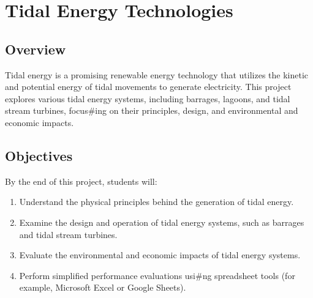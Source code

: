 \documentclass[letterpaper,10pt,english]{jupyterBook}
\begin{document}
\section{Tidal Energy Technologies}
\label{\detokenize{ProjectInstructions:tidal-energy-technologies}}

\subsection{Overview}
\label{\detokenize{ProjectInstructions:id30}}
\sphinxAtStartPar
Tidal energy is a promising renewable energy technology that utilizes
the kinetic and potential energy of tidal movements to generate
electricity. This project explores various tidal energy systems,
including barrages, lagoons, and tidal stream turbines, focus\#ing on
their principles, design, and environmental and economic impacts.


\subsection{Objectives}
\label{\detokenize{ProjectInstructions:id31}}
\sphinxAtStartPar
By the end of this project, students will:
\begin{enumerate}
%
\item {} 
\sphinxAtStartPar
Understand the physical principles behind the generation of tidal
energy.

\item {} 
\sphinxAtStartPar
Examine the design and operation of tidal energy systems, such as
barrages and tidal stream turbines.

\item {} 
\sphinxAtStartPar
Evaluate the environmental and economic impacts of tidal energy
systems.

\item {} 
\sphinxAtStartPar
Perform simplified performance evaluations usi\#ng spreadsheet tools
(for example, Microsoft Excel or Google Sheets).

\end{enumerate}
\end{document}
